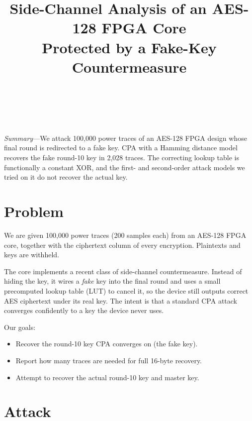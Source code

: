 \documentclass[conference,9pt]{IEEEtran}
\begin{document}
\title{Side-Channel Analysis of an AES-128 FPGA Core\\Protected by a Fake-Key Countermeasure}

\author{
\\[4pt]
\\[2pt]
}

\maketitle

\noindent\textit{Summary}---We attack 100{,}000 power traces of an AES-128 FPGA design whose final round is redirected to a fake key. CPA with a Hamming distance model recovers the fake round-10 key in 2{,}028 traces. The correcting lookup table is functionally a constant XOR, and the first- and second-order attack models we tried on it do not recover the actual key.

\section{Problem}

We are given 100{,}000 power traces (200 samples each) from an AES-128 FPGA core, together with the ciphertext column of every encryption. Plaintexts and keys are withheld.

The core implements a recent class of side-channel countermeasure. Instead of hiding the key, it wires a \emph{fake} key into the final round and uses a small precomputed lookup table (LUT) to cancel it, so the device still outputs correct AES ciphertext under its real key. The intent is that a standard CPA attack converges confidently to a key the device never uses.

Our goals:
\begin{itemize}
\item Recover the round-10 key CPA converges on (the fake key).
\item Report how many traces are needed for full 16-byte recovery.
\item Attempt to recover the actual round-10 key and master key.
\end{itemize}

\section{Attack}
\end{document}
